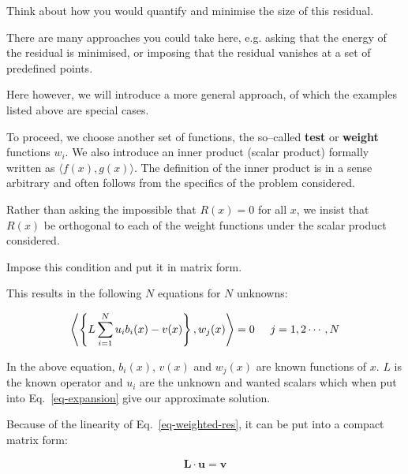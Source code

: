 \begin{cue}
Think about how you would quantify and minimise the size of this residual. 
\end{cue}

There are many approaches you could take here, e.g. asking that the energy of the residual is minimised, or imposing that the residual vanishes at a set of predefined points.

Here however, we will introduce a more general approach, of which the examples listed above are special cases.

\noindent{}To proceed, we choose another set of functions, the so--called \textbf{test} or \textbf{weight} functions $w_i$. We also introduce an inner product (scalar product) formally written as $\langle f(x),g(x) \rangle$. The definition of the inner product is in a sense arbitrary and often follows from the specifics of the problem considered.

Rather than asking the impossible that $R(x)=0$ for all $x$, we insist that $R(x)$ be orthogonal to each of the weight functions under the scalar product considered.

\begin{cue}
Impose this condition and put it in matrix form.  
\end{cue}

This results in the following $N$ equations for $N$ unknowns:

\begin{equation}
\left\langle \left\{ L \sum_{i=1}^N u_i b_i(x) - v(x)  \right\}, w_j(x) \right\rangle = 0 \hspace{0.5cm} j=1,2\cdots,N \label{eq-weighted-res}
\end{equation}

In the above equation, $b_i(x)$, $v(x)$ and $w_j(x)$ are known functions of $x$. $L$ is the known operator and $u_i$ are the unknown and wanted scalars which when put into Eq.~\ref{eq-expansion} give our approximate solution.

Because of the linearity of Eq.~\ref{eq-weighted-res}, it can be put into a compact matrix form:

\begin{equation}
{\mathbf L} \cdot {\mathbf u} = {\mathbf v}
\end{equation} 

